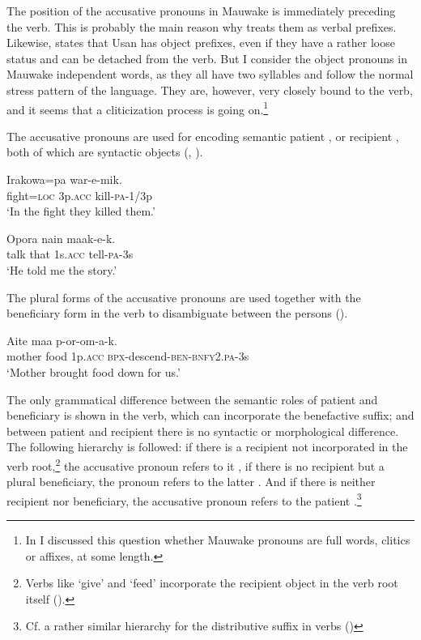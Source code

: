 The position of the accusative pronouns in Mauwake is immediately preceding the verb. This is probably the main reason why \citet{ZGraggen1971} treats them as verbal prefixes. Likewise, \citet[108]{Reesink1987} states that Usan has object prefixes, even if they have a rather loose status and can be detached from the verb. But I consider the object pronouns in Mauwake independent words, as they all have two syllables and follow the normal stress pattern of the language. They are, however, very closely bound to the verb, and it seems that a cliticization process is going on.\footnote{In \citet{Jarvinen1991} I discussed this question whether Mauwake pronouns are full words, clitics or affixes, at some length.} 

The accusative pronouns are used for encoding semantic patient , or recipient , both of which are syntactic objects (, ). 

\ea%
\label{ex:3:x548}
\gll Irakowa=pa  war-e-mik. \\
fight=\textsc{loc} 3p.\textsc{acc} kill-\textsc{pa}-1/3p\\
\glt`In the fight they killed them.'
\z

\ea%
\label{ex:3:x550}
\gll Opora nain  maak-e-k. \\
talk that 1s.\textsc{acc} tell-\textsc{pa}-3s\\
\glt`He told me the story.' 
\z

The plural forms of the accusative pronouns are used together with the beneficiary form in the verb to disambiguate between the persons  ().

\ea%
\label{ex:3:x549}
\gll Aite maa  p-or-om-a-k. \\
mother food 1p.\textsc{acc} \textsc{bpx}-descend-\textsc{ben}-\textsc{bnfy}2.\textsc{pa}-3s\\
\glt`Mother brought food down for us.'
\z

The only grammatical difference between the semantic roles of patient and beneficiary is shown in the verb, which can incorporate the benefactive suffix; and between patient and recipient there is no syntactic or morphological difference. The following hierarchy is followed: if there is a recipient not incorporated in the verb root,\footnote{Verbs like `give' and `feed' incorporate the recipient object in the verb root itself ().} the accusative pronoun refers to it , if there is no recipient but a plural beneficiary, the pronoun refers to the latter . And if there is neither recipient nor beneficiary, the accusative pronoun refers to the patient .\footnote{Cf. a rather similar hierarchy for the distributive suffix in verbs ()} 

